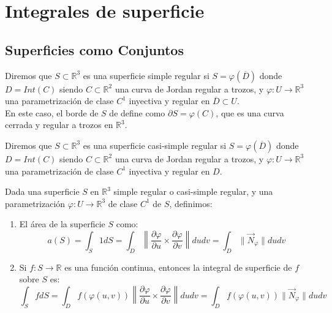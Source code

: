 \section{Integrales de superficie}


\subsection{Superficies como Conjuntos}

\begin{definición} 
Diremos que $S \subset \mathbb{R}^3$ es una superficie simple regular si $S = \varphi (\overline{D})$ donde $D = Int(C)$ siendo $C \subset \mathbb{R}^2$ una curva de Jordan regular a trozos, y $\varphi: U \to \mathbb{R}^3$ una parametrización de clase $C^1$ inyectiva y regular en $\overline{D} \subset U$.\\
En este caso, el borde de $S$ de define como $ \partial S = \varphi(C)$, que es una curva cerrada y regular a trozos en $\mathbb{R}^3$.
\end{definición}

\begin{definición} 
Diremos que $S \subset \mathbb{R}^3$ es una superficie casi-simple regular si $S = \varphi (\overline{D})$ donde $D = Int(C)$ siendo $C \subset \mathbb{R}^2$ una curva de Jordan regular a trozos, y $\varphi: U \to \mathbb{R}^3$ una parametrización de clase $C^1$ inyectiva y regular en $D$.
\end{definición}

\begin{definición} 
Dada una superficie $S$ en $\mathbb{R}^3$ simple regular o casi-simple regular, y una parametrización $\varphi: U \to \mathbb{R}^3$ de clase $C^1$ de $S$, definimos:
\vspace{-0.5em}
\begin{enumerate}
    \item El área de la superficie $S$ como: $$ a(S) = \int_{S} 1 dS = \int_{D}
              \left\lVert \frac{\partial \varphi}{\partial u} \times \frac{\partial
                  \varphi}{\partial v} \right\rVert dudv = \int_{D} \lVert \vec{N}_\varphi \rVert
              dudv $$
    \item  Si $f: S \to \mathbb{R}$ es una función continua, entonces la integral de
          superficie de $f$ sobre $S$ es: $$ \int_{S} f dS = \int_{D} f(\varphi(u,v))
              \left\lVert \frac{\partial \varphi}{\partial u} \times \frac{\partial
                  \varphi}{\partial v} \right\rVert dudv = \int_{D} f(\varphi(u,v)) \lVert
              \vec{N}_\varphi \rVert dudv $$
\end{enumerate}
\end{definición}

